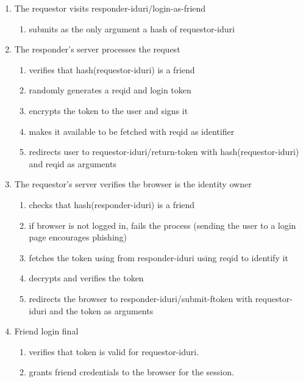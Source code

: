 \documentclass[letterpaper,11pt,oneside]{article}
\begin{document}
\begin{enumerate}
\item The requestor visits responder-iduri/login-as-friend
    \begin{enumerate}
    \item submits as the only argument a hash of requestor-iduri
    \end{enumerate}

\item The responder's server processes the request
    \begin{enumerate}
    \item verifies that hash(requestor-iduri) is a friend
    \item randomly generates a reqid and login token
    \item encrypts the token to the user and signs it
    \item makes it available to be fetched with reqid as identifier
    \item redirects user to requestor-iduri/return-token with hash(requestor-iduri) and reqid as
            arguments
    \end{enumerate}

\item The requestor's server verifies the browser is the identity owner
    \begin{enumerate}
    \item checks that hash(responder-iduri) is a friend
    \item if browser is not logged in, fails the process
            (sending the user to a login page encourages phishing)
    \item fetches the token using from responder-iduri using reqid to identify it
    \item decrypts and verifies the token
    \item redirects the browser to responder-iduri/submit-ftoken with requestor-iduri 
    and the token as arguments
    \end{enumerate}

\item Friend login final
    \begin{enumerate}
    \item verifies that token is valid for requestor-iduri.
    \item grants friend credentials to the browser for the session.
    \end{enumerate}
\end{enumerate}
\end{document}
